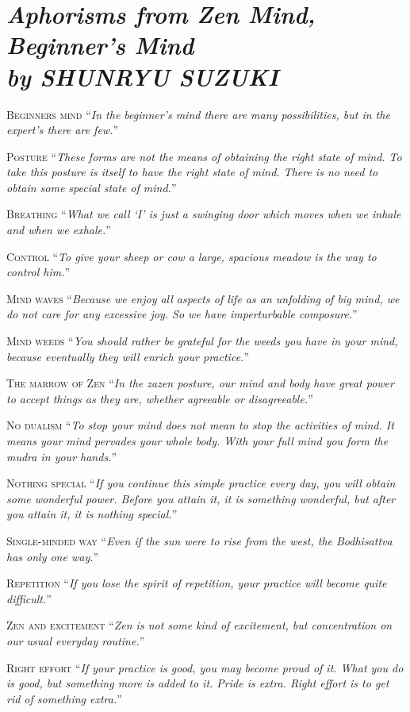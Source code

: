 \documentclass[14pt]{extarticle}
\newcommand{\aphor}[3]{
    \lettrine[lines=2, lraise=0.15]{#1}{#2}
    \enquote{\textit{#3}}
}
\begin{document}
\section*{\LARGE\sffamily\slshape Aphorisms from Zen Mind, Beginner's Mind \\ {\large by SHUNRYU SUZUKI }}
\aphor{B}{eginners mind} {In the beginner's mind there are many possibilities, but in the expert's there are few.}

\aphor{P}{osture} {These forms are not the means of obtaining the right state of mind. To take this posture is itself to have the right state of mind. There is no need to obtain some special state of mind.}

\aphor{B}{reathing} {What we call \enquote{I} is just a swinging door which moves when we inhale and when we exhale.}

\aphor{C}{ontrol} {To give your sheep or cow a large, spacious meadow is the way to control him.}

\aphor{M}{ind waves} {Because we enjoy all aspects of life as an unfolding of big mind, we do not care for any excessive joy. So we have imperturbable composure.} 

\aphor{M}{ind weeds} {You should rather be grateful for the weeds you have in your mind, because eventually they will enrich your practice.}


\aphor{T}{he marrow of Zen} {In the zazen posture, our mind and body have great power to accept things as they are, whether agreeable or disagreeable.}


\aphor{N}{o dualism} {To stop your mind does not mean to stop the activities of mind. It means your mind pervades your whole body. With your full mind you form the mudra in your hands.}

\pagebreak

\aphor{N}{othing special} {If you continue this simple practice every day, you will obtain some wonderful power. Before you attain it, it is something wonderful, but after you attain it, it is nothing special.}

\aphor{S}{ingle-minded way} {Even if the sun were to rise from the west, the Bodhisattva has only one way.}

\aphor{R}{epetition} {If you lose the spirit of repetition, your practice will become quite difficult.}

\aphor{Z}{en and excitement} {Zen is not some kind of excitement, but concentration on our usual everyday routine.}

\aphor{R}{ight effort} {If your practice is good, you may become proud of it. What you do is good, but something more is added to it. Pride is extra. Right effort is to get rid of something extra.}
\end{document}
